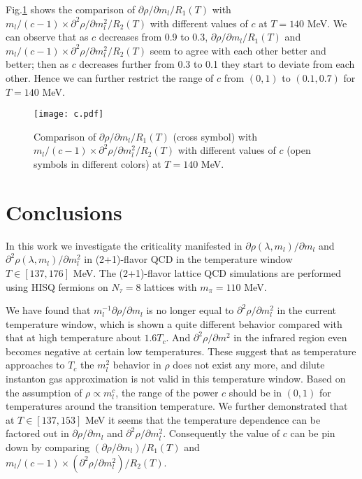 \documentclass[a4paper,11pt]{article}
\numberwithin{equation}{section}
\begin{document}
Fig.\ref{estimate_c} shows the comparison of $\partial \rho/\partial m_l/R_1(T)$ with $m_l/(c-1) \times \partial^2 \rho/\partial m_l^2/R_2(T)$ with different values of $c$ at $T=140$ MeV. 
We can observe that as $c$ decreases from 0.9 to 0.3, $\partial \rho/\partial m_l/R_1(T)$ and $m_l/(c-1) \times \partial^2 \rho/\partial m_l^2/R_2(T)$ seem to agree with each other better and better; then as $c$ decreases further from 0.3 to 0.1 they start to deviate from each other. Hence we can further restrict the range of $c$ from $(0,1)$ to $(0.1,0.7)$ for $T=140$ MeV.


\begin{figure}[H]
\centering
\texttt{[image: c.pdf]}
\caption{Comparison of $\partial \rho/\partial m_l/R_1(T)$ (cross symbol) with $m_l/(c-1) \times \partial^2 \rho/\partial m_l^2/R_2(T)$ with different values of $c$ (open symbols in different colors) at $T=140$ MeV.}
\label{estimate_c}
\end{figure}










\section{Conclusions}


In this work we investigate the criticality manifested in $\partial \rho(\lambda, m_l ) / \partial m_l$ and $\partial^2 \rho(\lambda, m_l ) / \partial m_l^2$ in (2+1)-flavor QCD in the temperature window $T\in[137,176]$ MeV.
The (2+1)-flavor lattice QCD simulations are performed using HISQ fermions on $N_\tau=8$ lattices with $m_\pi=110$ MeV.



We have found that $m_l^{-1}\partial \rho/\partial m_l$ is no longer equal to $\partial ^2\rho/\partial m_l^2$ in the current temperature window, which is shown a quite different behavior compared with that at high temperature about $1.6T_c$. And $\partial ^2\rho/\partial m^2$ in the infrared region even becomes negative at certain low temperatures. These suggest that as temperature approaches to $T_c$ the $m_l^2$ behavior in $\rho$ does not exist any more, and dilute instanton gas approximation is not valid in this temperature window. 
Based on the assumption of $\rho\propto m_l^c$, the range of the power $c$ should be in $(0,1)$ for temperatures around the transition temperature. 
We further demonstrated that at $T \in [137, 153]$ MeV it seems that the temperature dependence can be factored out in $\partial \rho/ \partial m_l$ and $\partial^2 \rho/ \partial m_l^2$. Consequently the value of $c$ can be pin down by comparing ${(\partial \rho/\partial m_l)}/{ R_1(T)}$ and $m_l/(c-1) \times {(\partial^2 \rho/\partial m_l^2)}/{ R_2(T)}$. 
\end{document}
